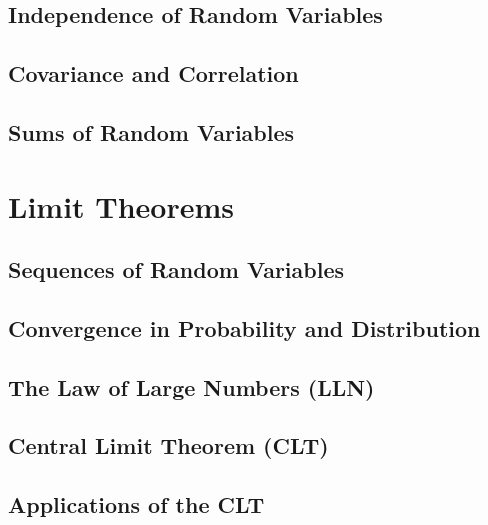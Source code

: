\documentclass[
  12pt,
]{krantzNoCorner}
\begin{document}
\hypertarget{independence-of-random-variables}{%
\section{Independence of Random Variables}\label{independence-of-random-variables}}

\hypertarget{covariance-and-correlation}{%
\section{Covariance and Correlation}\label{covariance-and-correlation}}

\hypertarget{sums-of-random-variables}{%
\section{Sums of Random Variables}\label{sums-of-random-variables}}

\hypertarget{limit-theorems}{%
\chapter{Limit Theorems}\label{limit-theorems}}

\hypertarget{sequences-of-random-variables}{%
\section{Sequences of Random Variables}\label{sequences-of-random-variables}}

\hypertarget{convergence-in-probability-and-distribution}{%
\section{Convergence in Probability and Distribution}\label{convergence-in-probability-and-distribution}}

\hypertarget{the-law-of-large-numbers-lln}{%
\section{The Law of Large Numbers (LLN)}\label{the-law-of-large-numbers-lln}}

\hypertarget{central-limit-theorem-clt}{%
\section{Central Limit Theorem (CLT)}\label{central-limit-theorem-clt}}

\hypertarget{applications-of-the-clt}{%
\section{Applications of the CLT}\label{applications-of-the-clt}}
\end{document}
